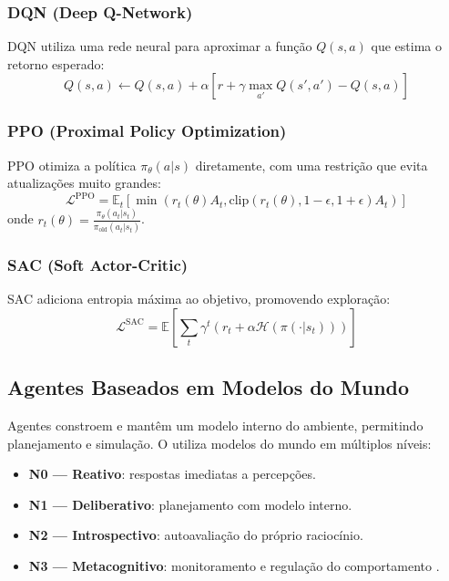 \subsubsection*{DQN (Deep Q-Network)}
DQN \cite{mnih2015human} utiliza uma rede neural para aproximar a função
$Q(s,a)$ que estima o retorno esperado:
\[Q(s,a) \leftarrow Q(s,a) + \alpha \left[r + \gamma \max_{a'} Q(s', a') - Q(s,a) \right]
\]
\subsubsection*{PPO (Proximal Policy Optimization)}
PPO \cite{schulman2017proximal} otimiza a política $\pi_\theta(a|s)$
diretamente, com uma restrição que evita atualizações muito grandes:
\[\mathcal{L}^{\text{PPO}} = \mathbb{E}_t \left[\min(r_t(\theta) A_t, \text{clip}(r_t(\theta), 1-\epsilon, 1+\epsilon) A_t) \right]
\]
onde $r_t(\theta) = \frac{\pi_\theta(a_t|s_t)}{\pi_{\text{old}}(a_t|s_t)}$.
\subsubsection*{SAC (Soft Actor-Critic)}
SAC \cite{haarnoja2018soft} adiciona entropia máxima ao objetivo, promovendo
exploração:
\[\mathcal{L}^{\text{SAC}} = \mathbb{E} \left[\sum_t \gamma^t (r_t + \alpha \mathcal{H}(\pi(\cdot|s_t))) \right]
\]
\subsection{Agentes Baseados em Modelos do Mundo}
Agentes  constroem e mantêm um modelo interno do
ambiente, permitindo planejamento e simulação. O \opencodeeco{} utiliza
modelos do mundo em múltiplos níveis:
\begin{itemize}
\item \textbf{N0 --- Reativo}: respostas imediatas a percepções.
\item \textbf{N1 --- Deliberativo}: planejamento com modelo interno.
\item \textbf{N2 --- Introspectivo}: autoavaliação do próprio raciocínio.
\item \textbf{N3 --- Metacognitivo}: monitoramento e regulação do
comportamento \cite{opencode2026spec036}.
\end{itemize}

